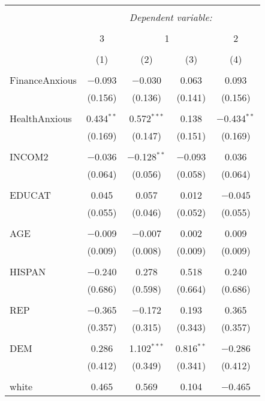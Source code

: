 \begin{table}[!htbp] \centering 
  \caption{} 
  \label{} 
\begin{tabular}{@{\extracolsep{5pt}}lcccc} 
\\[-1.8ex]\hline 
\hline \\[-1.8ex] 
 & \multicolumn{4}{c}{\textit{Dependent variable:}} \\ 
\cline{2-5} 
\\[-1.8ex] & 3 & \multicolumn{2}{c}{1} & 2 \\ 
\\[-1.8ex] & (1) & (2) & (3) & (4)\\ 
\hline \\[-1.8ex] 
 FinanceAnxious & $-$0.093 & $-$0.030 & 0.063 & 0.093 \\ 
  & (0.156) & (0.136) & (0.141) & (0.156) \\ 
  & & & & \\ 
 HealthAnxious & 0.434$^{**}$ & 0.572$^{***}$ & 0.138 & $-$0.434$^{**}$ \\ 
  & (0.169) & (0.147) & (0.151) & (0.169) \\ 
  & & & & \\ 
 INCOM2 & $-$0.036 & $-$0.128$^{**}$ & $-$0.093 & 0.036 \\ 
  & (0.064) & (0.056) & (0.058) & (0.064) \\ 
  & & & & \\ 
 EDUCAT & 0.045 & 0.057 & 0.012 & $-$0.045 \\ 
  & (0.055) & (0.046) & (0.052) & (0.055) \\ 
  & & & & \\ 
 AGE & $-$0.009 & $-$0.007 & 0.002 & 0.009 \\ 
  & (0.009) & (0.008) & (0.009) & (0.009) \\ 
  & & & & \\ 
 HISPAN & $-$0.240 & 0.278 & 0.518 & 0.240 \\ 
  & (0.686) & (0.598) & (0.664) & (0.686) \\ 
  & & & & \\ 
 REP & $-$0.365 & $-$0.172 & 0.193 & 0.365 \\ 
  & (0.357) & (0.315) & (0.343) & (0.357) \\ 
  & & & & \\ 
 DEM & 0.286 & 1.102$^{***}$ & 0.816$^{**}$ & $-$0.286 \\ 
  & (0.412) & (0.349) & (0.341) & (0.412) \\ 
  & & & & \\ 
 white & 0.465 & 0.569 & 0.104 & $-$0.465 \\ 

\end{tabular}
\end{table}
